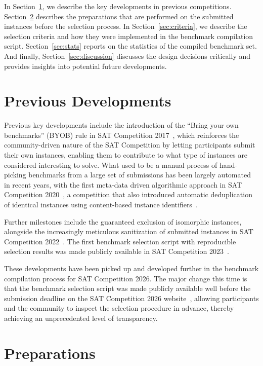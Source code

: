 \documentclass[conference]{IEEEtran}
\begin{document}
In Section~\ref{sec:prev}, we describe the key developments in previous competitions.
Section~\ref{sec:pre} describes the preparations that are performed on the submitted instances before the selection process.
In Section~\ref{sec:criteria}, we describe the selection criteria and how they were implemented in the benchmark compilation script.
Section~\ref{sec:stats} reports on the statistics of the compiled benchmark set.
And finally, Section~\ref{sec:discussion} discusses the design decisions critically and provides insights into potential future developments. 

\section{Previous Developments}\label{sec:prev}

Previous key developments include the introduction of the ``Bring your own benchmarks'' (BYOB) rule in SAT Competition 2017~\cite{sc2017proc}, which reinforces the community-driven nature of the SAT Competition by letting participants submit their own instances, enabling them to contribute to what type of instances are considered interesting to solve.
What used to be a manual process of hand-picking benchmarks from a large set of submissions has been largely automated in recent years, with the first meta-data driven algorithmic approach in SAT Competition 2020~\cite{sc2020aij}, a competition that also introduced automatic deduplication of identical instances using content-based instance identifiers~\cite{gbdsatpaper}.

Further milestones include the guaranteed exclusion of isomorphic instances, alongside the increasingly meticulous sanitization of submitted instances in SAT Competition 2022~\cite{sc2022proc}.
The first benchmark selection script with reproducible selection results was made publicly available in SAT Competition 2023~\cite{bench23report}.

These developments have been picked up and developed further in the benchmark compilation process for SAT Competition 2026.
The major change this time is that the benchmark selection script was made publicly available well before the submission deadline on the SAT Competition 2026 website~\cite{sc2026web}, allowing participants and the community to inspect the selection procedure in advance, thereby achieving an unprecedented level of transparency.

\section{Preparations}\label{sec:pre}
\end{document}
